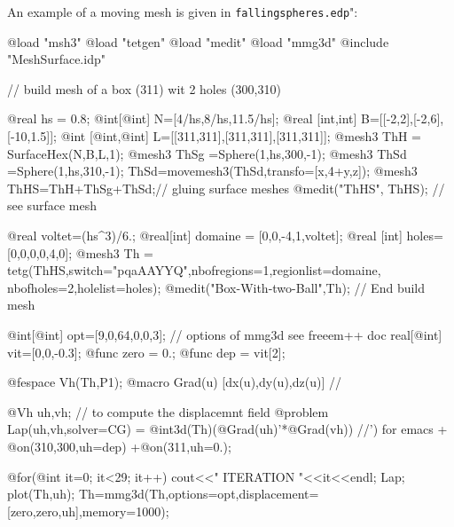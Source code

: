 \documentclass[a4paper,twoside,12pt]{book}
\begin{document}
An example of a moving mesh is given in \texttt{fallingspheres.edp}":
\begin{example}
\bFF
@load "msh3"  @load "tetgen"  @load "medit"  @load "mmg3d"                                                               
@include "MeshSurface.idp"

// build mesh of a box (311)  wit 2 holes  (300,310)

@real hs = 0.8; 
@int[@int]  N=[4/hs,8/hs,11.5/hs];
@real [int,int]  B=[[-2,2],[-2,6],[-10,1.5]];
@int [@int,@int]  L=[[311,311],[311,311],[311,311]];
@mesh3 ThH = SurfaceHex(N,B,L,1);
@mesh3 ThSg =Sphere(1,hs,300,-1); 
@mesh3 ThSd =Sphere(1,hs,310,-1);   ThSd=movemesh3(ThSd,transfo=[x,4+y,z]);
@mesh3 ThHS=ThH+ThSg+ThSd;// gluing surface meshes 
@medit("ThHS", ThHS); // see surface mesh

@real voltet=(hs^3)/6.;
@real[int] domaine = [0,0,-4,1,voltet];
@real [int] holes=[0,0,0,0,4,0];
@mesh3 Th = tetg(ThHS,switch="pqaAAYYQ",nbofregions=1,regionlist=domaine, nbofholes=2,holelist=holes);    
@medit("Box-With-two-Ball",Th);
// End build mesh 

@int[@int] opt=[9,0,64,0,0,3];   // options  of mmg3d see freeem++ doc 
real[@int] vit=[0,0,-0.3];
@func zero = 0.;
@func dep  = vit[2];

@fespace Vh(Th,P1); 
@macro Grad(u) [dx(u),dy(u),dz(u)] //

@Vh uh,vh; //  to compute the displacemnt field 
@problem Lap(uh,vh,solver=CG) = @int3d(Th)(@Grad(uh)'*@Grad(vh))  //') for emacs
				  + @on(310,300,uh=dep) +@on(311,uh=0.); 

@for(@int it=0; it<29; it++){ 
  cout<<"  ITERATION       "<<it<<endl;
  Lap;
  plot(Th,uh);
  Th=mmg3d(Th,options=opt,displacement=[zero,zero,uh],memory=1000); 
 }
\eFF
\end{example}


\end{document}
